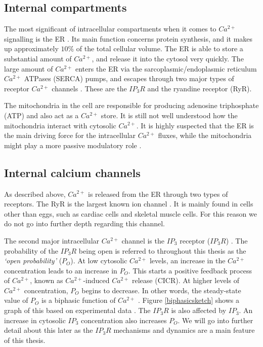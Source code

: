 {\subsection{Internal compartments}
The most significant of intracellular compartments when it comes to $Ca^{2+}$ signalling is the ER . Its main function concerns protein synthesis, and it makes up approximately $10\%$ of the total cellular volume. The ER is able to store a substantial amount of $Ca^{2+}$, and release it into the cytosol very quickly. The large amount of $Ca^{2+}$ enters the ER via the sarcoplasmic/endoplasmic reticulum $Ca^{2+}$ ATPases (SERCA) pumps, and escapes through two major types of receptor $Ca^{2+}$ channels . These are the $IP_3R$ and the ryandine receptor (RyR).

The mitochondria in the cell are responsible for producing adenosine triphosphate (ATP) and also act as a $Ca^{2+}$ store. It is still not well understood how the mitochondria interact with cytosolic $Ca^{2+}$. It is highly suspected that the ER is the main driving force for the intracellular $Ca^{2+}$ fluxes, while the mitochondria might play a more passive modulatory role .

\subsection{Internal calcium channels}

As described above, $Ca^{2+}$ is released from the ER through two types of receptors. The RyR is the largest known ion channel . It is mainly found in cells other than eggs, such as cardiac cells and skeletal muscle cells. For this reason we do not go into further depth regarding this channel.

The second major intracellular $Ca^{2+}$ channel is the $IP_3$ receptor ($IP_3R$) . The probability of the $IP_3R$ being open is referred to throughout this thesis as the \textit{`open probability'} ($P_O$). At low cytosolic $Ca^{2+}$ levels, an increase in the $Ca^{2+}$ concentration leads to an increase in $P_O$. This starts a positive feedback process of $Ca^{2+}$, known as $Ca^{2+}$-induced $Ca^{2+}$ release (CICR). At higher levels of $Ca^{2+}$ concentration, $P_O$ begins to decrease. In other words, the steady-state value of $P_O$ is a biphasic function of $Ca^{2+}$ . Figure \ref{biphasicsketch} shows a graph of this based on experimental data . The $IP_3R$ is also affected by $IP_3$. An increase in cytosolic $IP_3$ concentration also increases $P_O$. We will go into further detail about this later as the $IP_3R$ mechanisms and dynamics are a main feature of this thesis.

}
